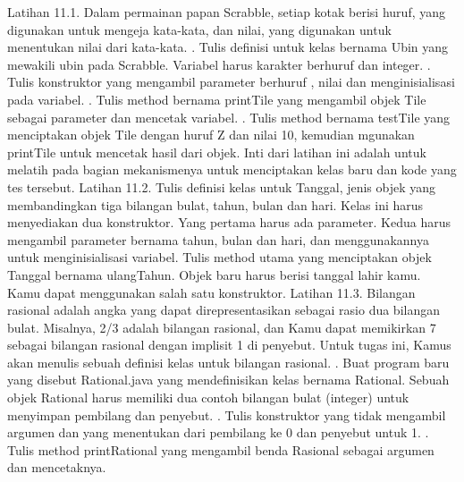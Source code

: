 Latihan 11.1. Dalam permainan papan Scrabble, setiap kotak berisi huruf, yang digunakan untuk mengeja kata-kata, dan nilai, yang digunakan untuk menentukan nilai dari kata-kata.
. Tulis definisi untuk kelas bernama Ubin yang mewakili ubin pada Scrabble. \newline
Variabel harus karakter berhuruf dan integer.
. Tulis konstruktor yang mengambil parameter berhuruf , nilai dan menginisialisasi pada variabel.
. Tulis method bernama printTile yang mengambil objek Tile sebagai parameter dan mencetak variabel.
. Tulis method bernama testTile yang menciptakan objek Tile dengan huruf Z dan nilai 10, kemudian mgunakan printTile untuk mencetak hasil dari objek.
\newline
Inti dari latihan ini adalah untuk melatih pada bagian mekanismenya untuk menciptakan kelas baru dan kode yang tes tersebut.
\newline
Latihan 11.2. Tulis definisi kelas untuk Tanggal, jenis objek yang membandingkan tiga bilangan bulat, tahun, bulan dan hari. Kelas ini harus menyediakan dua konstruktor. Yang pertama harus ada parameter. Kedua harus mengambil parameter bernama tahun, bulan dan hari, dan menggunakannya untuk menginisialisasi variabel.
\newline
Tulis method utama yang menciptakan objek Tanggal bernama ulangTahun. Objek baru harus berisi tanggal lahir kamu. Kamu dapat menggunakan salah satu konstruktor.
\newline
Latihan 11.3. Bilangan rasional adalah angka yang dapat direpresentasikan sebagai rasio dua bilangan bulat. Misalnya, 2/3 adalah bilangan rasional, dan Kamu dapat memikirkan 7 sebagai bilangan rasional dengan implisit 1 di penyebut. Untuk tugas ini, Kamus akan menulis sebuah definisi kelas untuk bilangan rasional.
. Buat program baru yang disebut Rational.java yang mendefinisikan kelas bernama Rational. Sebuah objek Rational harus memiliki dua contoh bilangan bulat (integer) untuk menyimpan pembilang dan penyebut.
. Tulis konstruktor yang tidak mengambil argumen dan yang menentukan dari pembilang ke 0 dan penyebut untuk 1.
. Tulis method printRational yang mengambil benda Rasional sebagai argumen dan mencetaknya.
\newline

